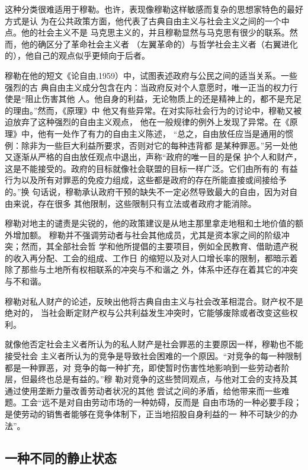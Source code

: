 这种分类很难适用于穆勒。也许，表现像穆勒这样敏感而复杂的思想家特色的最好方式是认
为在公共政策方面，他代表了古典自由主义与社会主义之间的一个中点。他的社会主义不是
马克思主义的，并且穆勒显然与马克思有很少的联系。然而，他的确区分了革命社会主义者
（左翼革命的）与哲学社会主义者（右翼进化的），他自己的观点似乎更倾向于后者。

穆勒在他的短文《论自由,1959）中，试图表述政府与公民之间的适当关系。一些强烈的古
典自由主义成分包含在内：当政府反对个人意愿时，唯一正当的权力行使是“阻止伤害其他
人。他自身的利益，无论物质上的还是精神上的，都不是充足的理由。”然而，《原理》中
他又有些异常。在对实际社会行为的讨论中，穆勒又被迫放弃了这种强烈的自由主义观点，
他在一般规律的例外上发现了异常。在《原理》中，他有一处作了有力的自由主义陈述，
“总之，自由放任应当是通用的惯例：除非为一些巨大利益所要求，否则对它的每种违背都
是某种罪恶。”另一处他又逐渐从严格的自由放任观点中退出，声称“政府的唯一目的是保
护个人和财产，这是不能接受的。政府的目标就像社会联盟的目标一样广泛。它们由所有的
有益行为以及所有对罪恶的免疫力组成，这些都是政府的存在所能直接或间接给予的。”换
句话说，穆勒承认政府干预的缺失不一定必然导致最大的自由，因为对自由来说，存在很多
其他限制，这些限制只有立法或者政府才能消除。

穆勒对地主的谴责是尖锐的，他的政策建议是从地主那里拿走地租和土地价值的额外增加额。
穆勒并不强调劳动者与社会其他成员，尤其是资本家之间的阶级冲突；然而，其全部社会哲
学和他所提倡的主要项目，例如全民教育、借助遗产税的收入再分配、工会的组成、工作日
的缩短以及对人口增长率的限制，都暗示着除了那些与土地所有权相联系的冲突与不和谐之
外，体系中还存在着其它的冲突与不和谐。

穆勒对私人财产的论述，反映出他将古典自由主义与社会改革相混合。财产权不是绝对的，
当社会断定财产权与公共利益发生冲突时，它能够废除或者改变这些权利。

就像他否定社会主义者所认为的私人财产是社会罪恶的主要原因一样，穆勒也不能接受社会
主义者所认为的竞争是导致社会困难的一个原因。“对竞争的每一种限制都是一种罪恶，对
竞争的每一种扩充，即使暂时伤害性地影响到一些劳动者阶层，但最终也总是有益的。”穆
勒对竞争的这些赞同观点，与他对工会的支持及其通过使用垄断力量改善劳动者状况的其他
尝试之间的矛盾，给他带来而一些难题。工会“远不是对自由劳动市场的一种妨碍，反而是
自由市场的一种必要手段；是使劳动的销售者能够在竞争体制下，正当地招股自身利益的一
种不可缺少的办法”。

\subsection{一种不同的静止状态}

